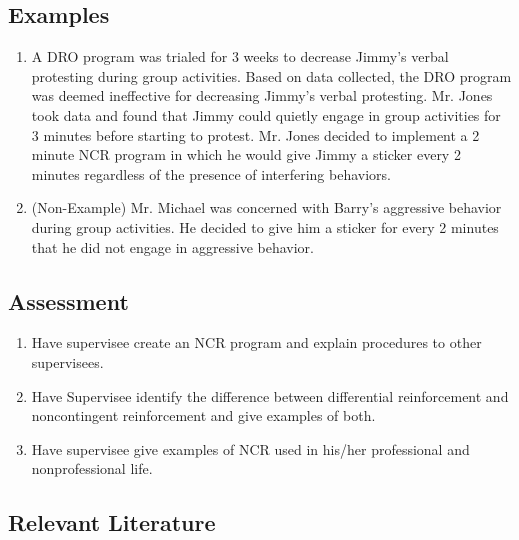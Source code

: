 \subsection{Examples}
\begin{enumerate}
\item A DRO program was trialed for 3 weeks to decrease Jimmy's verbal protesting during group activities. Based on data collected, the DRO program was deemed ineffective for decreasing Jimmy's verbal protesting. Mr. Jones took data and found that Jimmy could quietly engage in group activities for 3 minutes before starting to protest. Mr. Jones decided to implement a 2 minute NCR program in which he would give Jimmy a sticker every 2 minutes regardless of the presence of interfering behaviors.
\item (Non-Example) Mr. Michael was concerned with Barry's aggressive behavior during group activities. He decided to give him a sticker for every 2 minutes that he did not engage in aggressive behavior.
\end{enumerate}
%
\subsection{Assessment}
\begin{enumerate}
\item Have supervisee create an NCR program and explain procedures to other supervisees.
\item Have Supervisee identify the difference between differential reinforcement and noncontingent reinforcement and give examples of both.
\item Have supervisee give examples of NCR used in his/her professional and nonprofessional life.
\end{enumerate}
%
\subsection{Relevant Literature}
\begin{refsection}
\nocite{test,alang2017police,clayton2018black}
\printbibliography[heading=none]
\end{refsection}
%
